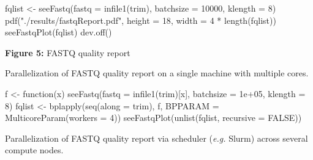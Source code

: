 \documentclass[14pt,]{article}
\newcommand{\hlnum}[1]{\textcolor[rgb]{0.816,0.125,0.439}{#1}}%
\newcommand{\hlstr}[1]{\textcolor[rgb]{0.251,0.627,0.251}{#1}}%
\newcommand{\hlopt}[1]{\textcolor[rgb]{0,0,0}{#1}}%
\newcommand{\hlstd}[1]{\textcolor[rgb]{0.251,0.251,0.251}{#1}}%
\newcommand{\hlkwc}[1]{\textcolor[rgb]{0.251,0.251,0.251}{#1}}%
\newcommand{\hlkwd}[1]{\textcolor[rgb]{0.878,0.439,0.125}{#1}}%
\newenvironment{Shaded}{\begin{myshaded}}{\end{myshaded}}
\newcommand{\KeywordTok}[1]{\hlkwd{#1}}
\newcommand{\DataTypeTok}[1]{\hlkwc{#1}}
\newcommand{\DecValTok}[1]{\hlnum{#1}}
\newcommand{\FloatTok}[1]{\hlnum{#1}}
\newcommand{\StringTok}[1]{\hlstr{#1}}
\newcommand{\OtherTok}[1]{{#1}}
\newcommand{\ControlFlowTok}[1]{\hlkwd{#1}}
\newcommand{\OperatorTok}[1]{\hlopt{#1}}
\newcommand{\NormalTok}[1]{\hlstd{#1}}
\begin{document}
\begin{Shaded}
\begin{Highlighting}[]
\NormalTok{fqlist <-}\StringTok{ }\KeywordTok{seeFastq}\NormalTok{(}\DataTypeTok{fastq =} \KeywordTok{infile1}\NormalTok{(trim), }\DataTypeTok{batchsize =} \DecValTok{10000}\NormalTok{, }\DataTypeTok{klength =} \DecValTok{8}\NormalTok{)}
\KeywordTok{pdf}\NormalTok{(}\StringTok{"./results/fastqReport.pdf"}\NormalTok{, }\DataTypeTok{height =} \DecValTok{18}\NormalTok{, }\DataTypeTok{width =} \DecValTok{4} \OperatorTok{*}\StringTok{ }\KeywordTok{length}\NormalTok{(fqlist))}
\KeywordTok{seeFastqPlot}\NormalTok{(fqlist)}
\KeywordTok{dev.off}\NormalTok{()}
\end{Highlighting}
\end{Shaded}

\textbf{Figure 5:} FASTQ quality report

Parallelization of FASTQ quality report on a single machine with multiple cores.

\begin{Shaded}
\begin{Highlighting}[]
\NormalTok{f <-}\StringTok{ }\ControlFlowTok{function}\NormalTok{(x) }\KeywordTok{seeFastq}\NormalTok{(}\DataTypeTok{fastq =} \KeywordTok{infile1}\NormalTok{(trim)[x], }\DataTypeTok{batchsize =} \FloatTok{1e+05}\NormalTok{, }\DataTypeTok{klength =} \DecValTok{8}\NormalTok{)}
\NormalTok{fqlist <-}\StringTok{ }\KeywordTok{bplapply}\NormalTok{(}\KeywordTok{seq}\NormalTok{(}\DataTypeTok{along =}\NormalTok{ trim), f, }\DataTypeTok{BPPARAM =} \KeywordTok{MulticoreParam}\NormalTok{(}\DataTypeTok{workers =} \DecValTok{4}\NormalTok{))}
\KeywordTok{seeFastqPlot}\NormalTok{(}\KeywordTok{unlist}\NormalTok{(fqlist, }\DataTypeTok{recursive =} \OtherTok{FALSE}\NormalTok{))}
\end{Highlighting}
\end{Shaded}

Parallelization of FASTQ quality report via scheduler (\emph{e.g.} Slurm) across several compute nodes.
\end{document}
